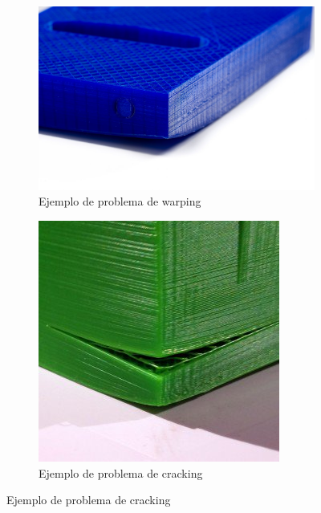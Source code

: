 \documentclass[11pt,a4paper]{article}
\begin{document}
\begin{figure}[H]
    \centering
    \begin{subfigure}[b]{0.4\textwidth}
        \includegraphics[width=\textwidth,cfbox=azul_marcos 4pt 0pt]{FOTOS/EJEMPLO_WARPING}
	\caption*{Ejemplo de problema de warping}
    \end{subfigure}
    \qquad %
    \begin{subfigure}[b]{0.4\textwidth}
        \includegraphics[width=\textwidth,cfbox=azul_marcos 4pt 0pt]{FOTOS/EJEMPLO_CRACKING}
	\caption*{Ejemplo de problema de cracking}
    \end{subfigure}   
\end{figure}
\end{document}
